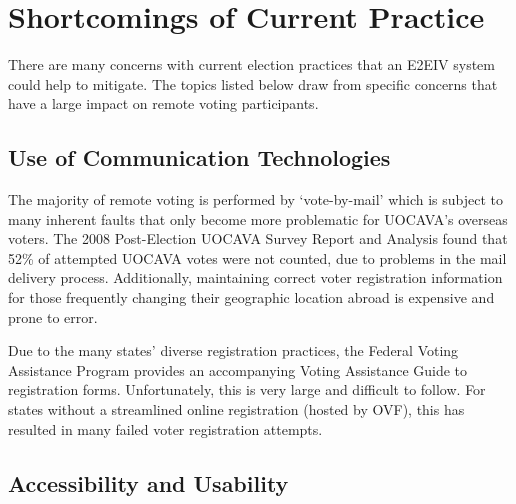 \section{Shortcomings of Current Practice}

There are many concerns with current election practices that an E2EIV system
could help to mitigate. The topics listed below draw from specific concerns
that have a large impact on remote voting participants.

\subsection{Use of Communication Technologies}
The majority of remote voting is performed by `vote-by-mail' which is
subject to many inherent faults that only become more problematic for UOCAVA's
overseas voters. The 2008 Post-Election UOCAVA Survey Report and Analysis
found that 52\% of attempted UOCAVA votes were not counted, due to problems
in the mail delivery process. Additionally, maintaining correct voter
registration information for those frequently changing their geographic
location abroad is expensive and prone to error.


Due to the many states' diverse registration practices, the Federal Voting
Assistance Program provides an accompanying Voting Assistance Guide to
registration forms. Unfortunately, this is very large and difficult to follow.
For states without a streamlined online registration (hosted by OVF), this has
resulted in many failed voter registration attempts.


\subsection{Accessibility and Usability}

